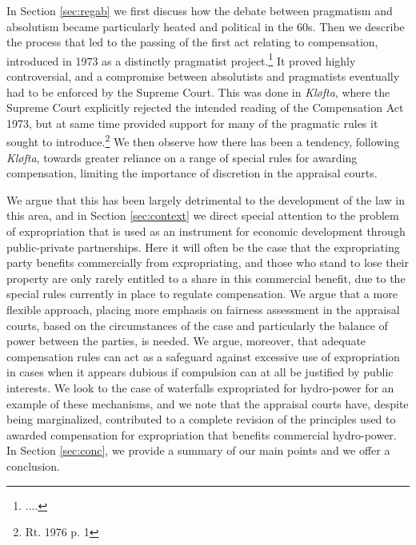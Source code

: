 \documentclass[10pt]{article} %
\begin{document}
In Section \ref{sec:regab} we first discuss how the debate between pragmatism and absolutism became particularly heated and political in the 60s. Then we describe the process that led to the passing of the first act relating to compensation, introduced in 1973 as a distinctly pragmatist project.\footnote{....} It proved highly controversial, and a compromise between absolutists and pragmatists eventually had to be enforced by the Supreme Court. This was done in \emph{Kløfta}, where the Supreme Court explicitly rejected the intended reading of the Compensation Act 1973, but at same time provided support for many of the pragmatic rules it sought to introduce.\footnote{Rt. 1976 p. 1} We then observe how there has been a tendency, following \emph{Kløfta}, towards greater reliance on a range of special rules for awarding compensation, limiting the importance of discretion in the appraisal courts. 

We argue that this has been largely detrimental to the development of the law in this area, and in Section \ref{sec:context} we direct special attention to the problem of expropriation that is used as an instrument for economic development through public-private partnerships. Here it will often be the case that the expropriating party benefits commercially from expropriating, and those who stand to lose their property are only rarely entitled to a share in this commercial benefit, due to the special rules currently in place to regulate compensation. We argue that a more flexible approach, placing more emphasis on fairness assessment in the appraisal courts, based on the circumstances of the case and particularly the balance of power between the parties, is needed. We argue, moreover, that adequate compensation rules can act as a safeguard against excessive use of expropriation in cases when it appears dubious if compulsion can at all be justified by public interests. We look to the case of waterfalls expropriated for hydro-power for an example of these mechanisms, and we note that the appraisal courts have, despite being marginalized, contributed to a complete revision of the principles used to awarded compensation for expropriation that benefits commercial hydro-power. In Section \ref{sec:conc}, we provide a summary of our main points and we offer a conclusion.
\end{document}
